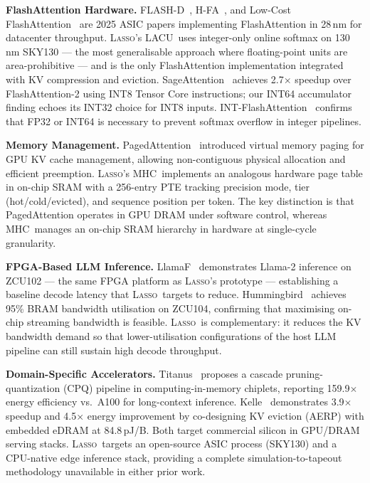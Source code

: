 \documentclass[conference]{IEEEtran}
\newcommand{\lasso}{\textsc{Lasso}}
\newcommand{\mhc}{\textsc{MHC}}
\newcommand{\lacu}{\textsc{LACU}}
\begin{document}
\textbf{FlashAttention Hardware.}
FLASH-D~\cite{flashd2025}, H-FA~\cite{hfa2024}, and Low-Cost FlashAttention~\cite{expmul2025}
are 2025 ASIC papers implementing FlashAttention in 28\,nm for
datacenter throughput. \lasso's \lacu\ uses integer-only online softmax
on 130\,nm SKY130 --- the most generalisable approach where
floating-point units are area-prohibitive --- and is the only
FlashAttention implementation integrated with KV compression and eviction.
SageAttention~\cite{sageattention2024} achieves 2.7$\times$ speedup over
FlashAttention-2 using INT8 Tensor Core instructions; our INT64 accumulator
finding echoes its INT32 choice for INT8 inputs. INT-FlashAttention~\cite{intflashattention2024}
confirms that FP32 or INT64 is necessary to prevent softmax overflow in
integer pipelines.

\textbf{Memory Management.}
PagedAttention~\cite{pagedattention2023} introduced virtual memory paging
for GPU KV cache management, allowing non-contiguous physical allocation
and efficient preemption. \lasso's \mhc\ implements an analogous hardware
page table in on-chip SRAM with a 256-entry PTE tracking precision mode,
tier (hot/cold/evicted), and sequence position per token. The key
distinction is that PagedAttention operates in GPU DRAM under software
control, whereas \mhc\ manages an on-chip SRAM hierarchy in hardware at
single-cycle granularity.

\textbf{FPGA-Based LLM Inference.}
LlamaF~\cite{llamaf2024} demonstrates Llama-2 inference on ZCU102 ---
the same FPGA platform as \lasso's prototype --- establishing a baseline
decode latency that \lasso\ targets to reduce. Hummingbird~\cite{hummingbird2025}
achieves 95\% BRAM bandwidth utilisation on ZCU104, confirming that
maximising on-chip streaming bandwidth is feasible. \lasso\ is
complementary: it reduces the KV bandwidth demand so that lower-utilisation
configurations of the host LLM pipeline can still sustain high decode
throughput.

\textbf{Domain-Specific Accelerators.}
Titanus~\cite{titanus2025} proposes a cascade pruning-quantization (CPQ)
pipeline in computing-in-memory chiplets, reporting 159.9$\times$ energy
efficiency vs.\ A100 for long-context inference. Kelle~\cite{kelle2025}
demonstrates 3.9$\times$ speedup and 4.5$\times$ energy improvement by
co-designing KV eviction (AERP) with embedded eDRAM at 84.8\,pJ/B. Both
target commercial silicon in GPU/DRAM serving stacks. \lasso\ targets
an open-source ASIC process (SKY130) and a CPU-native edge inference stack,
providing a complete simulation-to-tapeout methodology unavailable in
either prior work.
\end{document}
